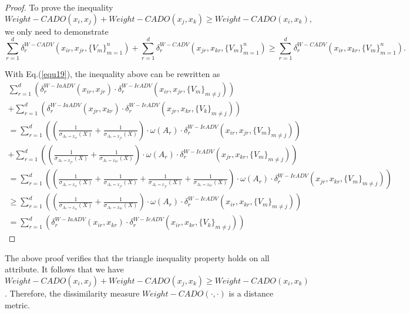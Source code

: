 \documentclass[review]{elsarticle}
\newtheorem{proof}{Proof}
\begin{document}
\begin{proof}
To prove the inequality $$Weight-CADO(x_i,x_j) + Weight-CADO(x_j,x_k) \geq Weight-CADO(x_i,x_k),$$ we only need to demonstrate
$$\sum_{r=1}^{d}\delta_r^{W-CADV}(x_{ir},x_{jr},\{V_m\}_{m = 1} ^ n)+\sum_{r=1}^{d}\delta_r^{W-CADV}(x_{jr},x_{kr},\{V_m\}_{m = 1} ^ n) \geq \sum_{r=1}^{d}\delta_r^{W-CADV}(x_{ir},x_{kr},\{V_m\}_{m = 1} ^ n).$$

With Eq.(\ref{equ19}), the inequality above can be rewritten as
$$\begin{array}{lll}
\sum_{r=1}^{d}(\delta_{r}^{W-IaADV}(x_{ir},x_{jr}) \cdot \delta_{r}^{W-IeADV}(x_{ir},x_{jr},\{V_m\}_{m \neq j})) \\
+ \sum_{r=1}^{d}(\delta_{r}^{W-IaADV}(x_{jr},x_{kr}) \cdot \delta_{r}^{W-IeADV}(x_{jr},x_{kr},\{V_k\}_{m \neq j})) \\
= \sum_{r=1}^{d}((\frac{1}{\sigma_{A_r = x_{ir}}(X)} + \frac{1}{\sigma_{A_r = x_{jr}}(X)}) \cdot \omega(A_r) \cdot \delta_{r}^{W-IeADV}(x_{ir},x_{jr},\{V_m\}_{m \neq j})) \\
+ \sum_{r=1}^{d}((\frac{1}{\sigma_{A_r = x_{jr}}(X)} + \frac{1}{\sigma_{A_r = x_{kr}}(X)}) \cdot \omega(A_r) \cdot \delta_{r}^{W-IeADV}(x_{jr},x_{kr},\{V_m\}_{m \neq j})) \\
= \sum_{r=1}^{d}((\frac{1}{\sigma_{A_r = x_{ir}}(X)} + \frac{1}{\sigma_{A_r = x_{jr}}(X)} + \frac{1}{\sigma_{A_r = x_{jr}}(X)} + \frac{1}{\sigma_{A_r = x_{kr}}(X)}) \cdot \omega(A_r) \cdot \delta_{r}^{W-IeADV}(x_{jr},x_{kr},\{V_m\}_{m \neq j})) \\
\geq \sum_{r=1}^{d}((\frac{1}{\sigma_{A_r = x_{ir}}(X)} + \frac{1}{\sigma_{A_r = x_{kr}}(X)}) \cdot \omega(A_r) \cdot \delta_{r}^{W-IeADV}(x_{ir},x_{kr},\{V_m\}_{m \neq j})) \\
= \sum_{r=1}^{d}(\delta_{r}^{W-IaADV}(x_{ir},x_{kr}) \cdot \delta_{r}^{W-IeADV}(x_{ir},x_{kr},\{V_k\}_{m \neq j}))
\end{array}$$
\end{proof}
The above proof verifies that the triangle inequality property holds on all attribute. It follows that we have $Weight-CADO(x_i,x_j) + Weight-CADO(x_j,x_k) \geq Weight-CADO(x_i,x_k)$. Therefore, the dissimilarity measure $Weight-CADO(\cdot,\cdot)$ is a distance metric.
\end{document}
